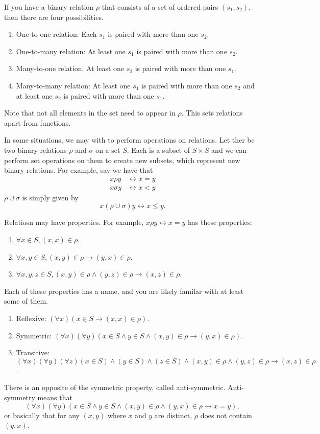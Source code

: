 \documentclass[nobib]{tufte-handout}
\begin{document}
If you have a binary relation $\rho$ that consists of 
a set of ordered pairs $(s_1, s_2)$, then there
are four possibilities.
\begin{enumerate}
    \item One-to-one relation: Each $s_1$ is paired with more than one $s_2$. 
    \item One-to-many relation: At least one $s_1$ is paired with more than one $s_2$. 
    \item Many-to-one relation: At least one $s_2$ is paired with more than one $s_1$. 
    \item Many-to-many relation: At least one $s_1$ is paired with more than one $s_2$ and 
    at least one $s_2$ is paired with more than one $s_1$. 
\end{enumerate}
Note that not all elements in the set need to appear in $\rho$. This 
sets relations apart from functions. 

In some situations, we may with to perform operations 
on relations. Let ther be two binary relations 
$\rho$ and $\sigma$ on a set $S$. Each is a subset 
of $S\times S$ and we can perform set operations 
on them to create new subsets, which represent new 
binary relations. For example, say we have that 
\begin{align*}
    x \rho y &\leftrightarrow x = y \\
    x \sigma y &\leftrightarrow x < y
\end{align*}
$\rho \cup \sigma$ is simply given by 
\[ x (\rho \cup \sigma) y \leftrightarrow x \leq y.\]

Relatiosn may have properties. For example, 
$x \rho y \leftrightarrow x = y$ has these properties:
\begin{enumerate}
    \item $\forall x\in S, (x,x) \in \rho$. 
    \item $\forall x, y \in S, (x,y) \in \rho \rightarrow (y,x) \in \rho$. 
    \item $\forall x,y,z \in S, (x,y) \in \rho \land (y,z) \in \rho \rightarrow (x,z) \in \rho$.
\end{enumerate}
Each of these properties has a name, and 
you are likely familar with at least some of them. 
\begin{enumerate}
    \item Reflexive: $(\forall x)(x \in S \rightarrow (x,x) \in \rho)$.
    \item Symmetric: $(\forall x)(\forall y)(x \in S \land y \in S \land (x,y) \in \rho \rightarrow (y,x) \in \rho)$.
    \item Transitive: $(\forall x)(\forall y)(\forall z)(x\in S) \land (y\in S) \land (z\in S) \land (x,y) \in \rho \land (y,z) \in \rho \rightarrow (x,z) \in \rho$. 
\end{enumerate}
There is an opposite of the symmetric property, 
called anti-symmetric. 
Anti-symmetry means that 
\[(\forall x)(\forall y)(x \in S \land y \in S \land (x,y)\in \rho \land (y,x) \in \rho \rightarrow x = y),\]
or basically that for any $(x,y)$ where $x$ and $y$ are distinct, $\rho$ does not contain $(y,x)$. 
\end{document}
